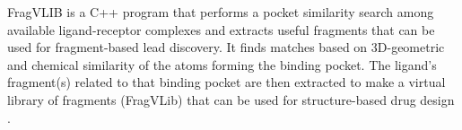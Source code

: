 FragVLIB is a C++ program that performs a pocket similarity search among available ligand-receptor complexes and extracts useful fragments that can be used for fragment-based lead discovery. It finds matches based on 3D-geometric and chemical similarity of the atoms forming the binding pocket. The ligand's fragment(s) related to that binding pocket are then extracted to make a virtual library of fragments (FragVLib) that can be used for structure-based drug design .